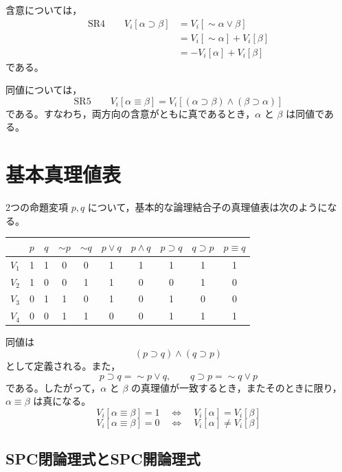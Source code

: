 \documentclass[../main.tex]{subfiles}
\begin{document}
含意については，
\[
  \begin{aligned}
  \mathrm{SR4}
  \qquad
  V_i[\alpha \supset \beta]
  &=
  V_i[\sim\alpha \lor \beta] \\
  &=
  V_i[\sim\alpha] + V_i[\beta] \\
  &=
  - V_i[\alpha] + V_i[\beta]
  \end{aligned}
\]
である。

同値については，
\[
  \mathrm{SR5}
  \qquad
  V_i[\alpha \equiv \beta]
  =
  V_i[(\alpha \supset \beta) \land (\beta \supset \alpha)]
\]
である。すなわち，両方向の含意がともに真であるとき，\(\alpha\) と \(\beta\) は同値である。

\section{基本真理値表}

2つの命題変項 \(p,q\) について，基本的な論理結合子の真理値表は次のようになる。

\begin{center}
\small
\begin{tabular}{c|cc|cc|cc|cc|c}
\toprule
 & \(p\) & \(q\) & \(\sim p\) & \(\sim q\) & \(p \lor q\) & \(p \land q\)
 & \(p \supset q\) & \(q \supset p\) & \(p \equiv q\) \\
\midrule
\(V_1\) & 1 & 1 & 0 & 0 & 1 & 1 & 1 & 1 & 1 \\
\(V_2\) & 1 & 0 & 0 & 1 & 1 & 0 & 0 & 1 & 0 \\
\(V_3\) & 0 & 1 & 1 & 0 & 1 & 0 & 1 & 0 & 0 \\
\(V_4\) & 0 & 0 & 1 & 1 & 0 & 0 & 1 & 1 & 1 \\
\bottomrule
\end{tabular}
\end{center}

同値は
\[
  (p \supset q) \land (q \supset p)
\]
として定義される。また，
\[
  p \supset q = \sim p \lor q,
  \qquad
  q \supset p = \sim q \lor p
\]
である。したがって，\(\alpha\) と \(\beta\) の真理値が一致するとき，またそのときに限り，\(\alpha \equiv \beta\) は真になる。
\[
  V_i[\alpha \equiv \beta] = 1
  \quad
  \Leftrightarrow
  \quad
  V_i[\alpha] = V_i[\beta]
\]
\[
  V_i[\alpha \equiv \beta] = 0
  \quad
  \Leftrightarrow
  \quad
  V_i[\alpha] \neq V_i[\beta]
\]

\subsection{SPC閉論理式とSPC開論理式}
\end{document}
